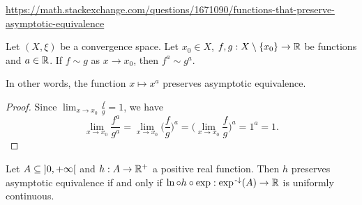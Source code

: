 \url{https://math.stackexchange.com/questions/1671090/functions-that-preserve-asymptotic-equivalence}


\begin{lemma}
Let $(X,\xi)$ be a convergence space. Let $x_0 \in X$, $f,g: X\setminus\{x_0\}\to \mathbb{R}$ be functions and $a\in \mathbb{R}$. If $f \sim g$ as $x\to x_0$, then $f^a \sim g^a$.
\end{lemma}
In other words, the function $x\mapsto x^a$ preserves asymptotic equivalence.
\begin{proof}
Since $\lim_{x\to x_0}\frac{f}{g} = 1$, we have
\[ \lim_{x\to x_0}\frac{f^a}{g^a} = \lim_{x\to x_0}\Big(\frac{f}{g}\Big)^a = \Big(\lim_{x\to x_0}\frac{f}{g}\Big)^a = 1^a = 1. \]
\end{proof}

\begin{proposition}
Let $A\subseteq \interval[o]{0,+\infty}$ and $h: A\to \mathbb{R}^+$ a positive real function. Then $h$ preserves asymptotic equivalence \textup{if and only if} $\ln\circ h\circ \exp: \exp^{{\text{\hspace{0.15em}-}\downarrow}}(A) \to \mathbb{R}$ is uniformly continuous.
\end{proposition}
